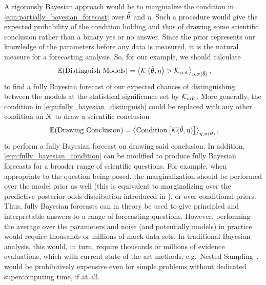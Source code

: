 \documentclass[twocolumn,english,aps,prl,amsmath,amssymb,reprint,footinbib,floatfix,showkeys]{revtex4-2}
\newcommand{\prior}{\pi}
\newcommand{\br}{\mathcal{K}}
\begin{document}
A rigorously Bayesian approach would be to marginalize the condition in \cref{eqn:partially_bayesian_forecast} over $\Tilde{\theta}$ and $\eta$. 
Such a procedure would give the expected probability of the condition holding and thus of drawing some scientific conclusion rather than a binary yes or no answer.
Since the prior represents our knowledge of the parameters before any data is measured, it is the natural measure for a forecasting analysis.
So, for our example, we should calculate
\begin{equation}~\label{eqn:fully_bayesian_distinguish}
    \mathbb{E}(\textrm{Distinguish Models}) = \left\langle \br\left(\Tilde{\theta}, \eta\right) > \br_{\rm crit} \right\rangle_{\eta, \prior(\Tilde{\theta})},
\end{equation}
to find a fully Bayesian forecast of our expected chances of distinguishing between the models at the statistical significance set by $\br_{\rm crit}$.
More generally, the condition in \cref{eqn:fully_bayesian_distinguish} could be replaced with any other condition on $\br$ to draw a scientific conclusion
\begin{equation}~\label{eqn:fully_bayesian_condition}
    \mathbb{E}(\textrm{Drawing Conclusion}) = \left\langle \textrm{Condition}\left[\br(\Tilde{\theta}, \eta)\right] \right\rangle_{\eta, \prior(\Tilde{\theta})},
\end{equation}
to perform a fully Bayesian forecast on drawing said conclusion. 
In addition, \cref{eqn:fully_bayesian_condition} can be modified to produce fully Bayesian forecasts for a broader range of scientific questions. 
For example, when appropriate to the question being posed, the marginalization should be performed over the model prior as well (this is equivalent to marginalizing over the predictive posterior odds distribution introduced in \citet{Trotta_2007b}), or over conditional priors. 
Thus, fully Bayesian forecasts can in theory be used to give principled and interpretable answers to a range of forecasting questions.
However, performing the average over the parameters and noise (and potentially models) in practice would require thousands or millions of mock data sets.
In traditional Bayesian analysis, this would, in turn, require thousands or millions of evidence evaluations, which with current state-of-the-art methods, e.g.\ Nested Sampling~\citep{Skilling_2004, NS_Primer}, would be prohibitively expensive even for simple problems without dedicated supercomputing time, if at all.
\end{document}
